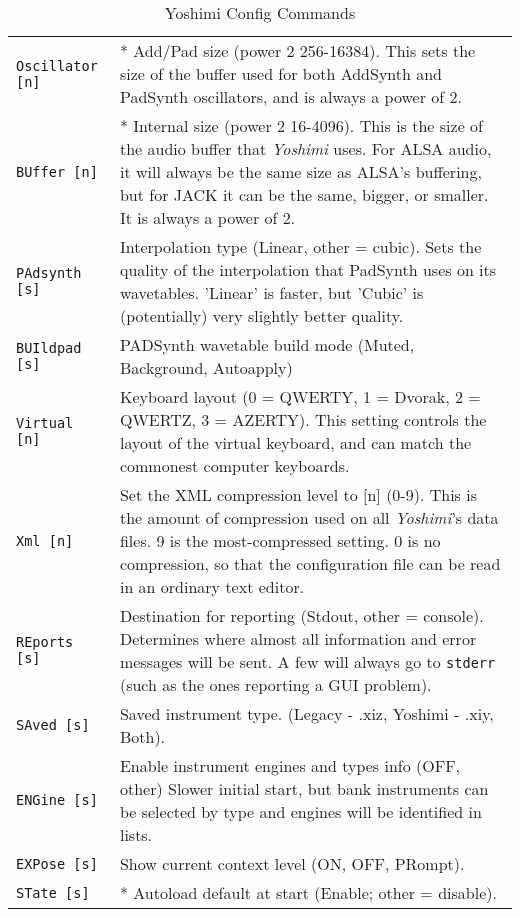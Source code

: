 \begin{center}
\begin{longtable}{p{4cm} p{10cm}}
\caption[Yoshimi Config Commands]{Yoshimi Config Commands} \\

\texttt{Oscillator [n]} &
   * Add/Pad size (power 2 256-16384).
   This sets the size of the buffer used for both AddSynth and PadSynth
   oscillators, and is always a power of 2.  \\
\texttt{BUffer [n]} &
   * Internal size (power 2 16-4096).
   This is the size of the audio buffer that \textsl{Yoshimi} uses.  For ALSA
   audio, it will always be the same size as ALSA's buffering, but for JACK it
   can be the same, bigger, or smaller. It is always a power of 2. \\
\texttt{PAdsynth [s]} &
   Interpolation type (Linear, other = cubic).
   Sets the quality of the interpolation that PadSynth uses on its wavetables.
   'Linear' is faster, but 'Cubic' is (potentially) very slightly better
   quality. \\
\texttt{BUIldpad [s]} &
   PADSynth wavetable build mode (Muted, Background, Autoapply)\\
\texttt{Virtual [n]} &
   Keyboard layout (0 = QWERTY, 1 = Dvorak, 2 = QWERTZ, 3 = AZERTY).
   This setting controls the layout of the virtual keyboard, and can match the
   commonest computer keyboards. \\
\texttt{Xml [n]} &
   Set the XML compression level to [n] (0-9).
   This is the amount of compression used on all
   \textsl{Yoshimi}'s data files. 9 is the most-compressed setting.
   0 is no compression, so that the configuration file
   can be read in an ordinary text editor. \\
\texttt{REports [s]} &
   Destination for reporting (Stdout, other = console).
   Determines where almost all information and error messages will be sent. A
   few will always go to \texttt{stderr} (such as the ones reporting a GUI
   problem). \\
\texttt{SAved [s]} &
   Saved instrument type. (Legacy - .xiz, Yoshimi - .xiy, Both).\\
\texttt{ENGine [s]} &
   Enable instrument engines and types info (OFF, {other})
   Slower initial start, but bank instruments can be selected by type and
   engines will be identified in lists.\\
\texttt{EXPose [s]} &
   Show current context level (ON, OFF, PRompt).\\
\texttt{STate [s]} &
   * Autoload default at start (Enable; other = disable).

\end{longtable}
\end{center}
